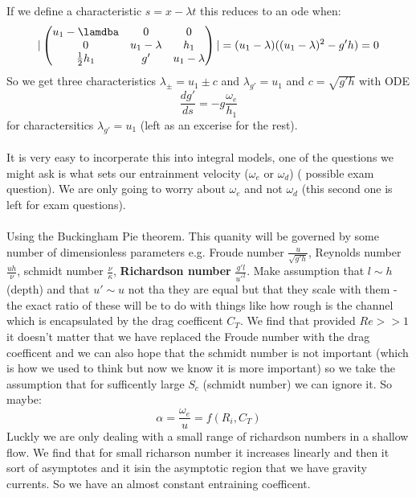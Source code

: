 \documentclass{article}
\begin{document}
If we define a characteristic $s = x - \lambda t$ this reduces to an ode when:
$$
 | \begin{pmatrix} u_1 - \lamdba & 0 & 0 \\
         0 & u_1 - \lambda & h_1 \\
 \frac{1}{2} h_1 & g' & u_1 - \lambda \end{pmatrix} | = (u_1 - \lambda)((u_1 - \lambda)^2 - g' h) = 0
$$
So we get three characteristics $\lambda_{\pm} = u_1 \pm c$ and $\lambda_{g'} = u_1$ and $c = \sqrt{g' h}$ with ODE $$
\frac{d g'}{ds} = - g \frac{\omega_e}{h_1}
$$
for charactersitics $\lambda_{g'} = u_1$ (left as an excerise for the rest).\\\\
It is very easy to incorperate this into integral models, one of the questions we might ask is what sets our entrainment velocity ($\omega_e$ or $\omega_d$) ( possible exam question). We are only going to worry about $\omega_e$ and not $\omega_d$ (this second one is left for exam questions).\\\\ Using the Buckingham Pie theorem. This quanity will be governed by some number of dimensionless parameters e.g. Froude number $\frac{u}{\sqrt{g' h}}$, Reynolds number $\frac{uh}{\nu}$, schmidt number $\frac{\nu}{\kappa}$, \textbf{Richardson number} $ \frac{g' l}{u'^2}$. Make assumption that $l \sim h$ (depth) and that $u' \sim u$  not tha they are equal but that they scale with them - the exact ratio of these will be to do with things like how rough is the channel which is encapsulated by the drag coefficent $C_T$. We find that provided $Re >>1$ it doesn't matter that we have replaced the Froude number with the drag coefficent and we can also hope that the schmidt number is not important (which is how we used to think but now we know it is more important) so we take the assumption that for sufficently large $S_c$ (schmidt number) we can ignore it. So maybe:
$$ \alpha = \frac{\omega_e}{u} = f( R_i , C_T)
$$
Luckly we are only dealing with a small range of richardson numbers in a shallow flow. We find that for small richarson number it increases linearly and then it sort of asymptotes and it isin the asymptotic region that we have gravity currents. So we have an almost constant entraining coefficent.
                    
\end{document}
